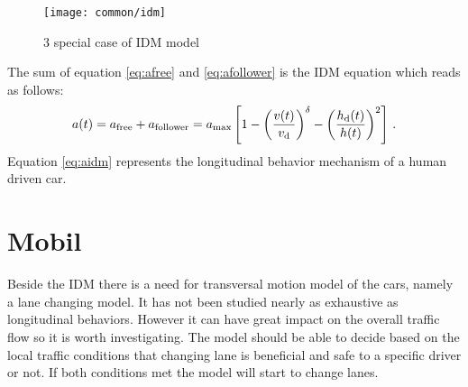 		\begin{figure}[ht]
			\centering
			\texttt{[image: common/idm]}
			\caption{3 special case of IDM model}
			\label{fig:idm}
		\end{figure}
		The sum of equation \ref{eq:afree} and \ref{eq:afollower} is the IDM equation which reads as follows:
		\begin{equation}
			a(t)=a_{\rm free}+a_{\rm follower}=a_{\rm max}\left [ 1 - \left ( \frac{v(t)}{v_{\rm d}} \right )^{\rm \delta} - \left ( \frac{h_{\rm d}(t)}{h(t)} \right )^2 \right ]\,.
			\label{eq:aidm}
		\end{equation}
		Equation \ref{eq:aidm} represents the longitudinal behavior mechanism of a human driven car.
	\section{Mobil} \label{sec:MOBIL}
		Beside the IDM there is a need for transversal motion model of the cars, namely a lane changing model. It has not been studied nearly as exhaustive as longitudinal behaviors. However it can have great impact on the overall traffic flow so it is worth investigating. The model should be able to decide based on the local traffic conditions that changing lane is beneficial and safe to a specific driver or not. If both conditions met the model will start to change lanes.

